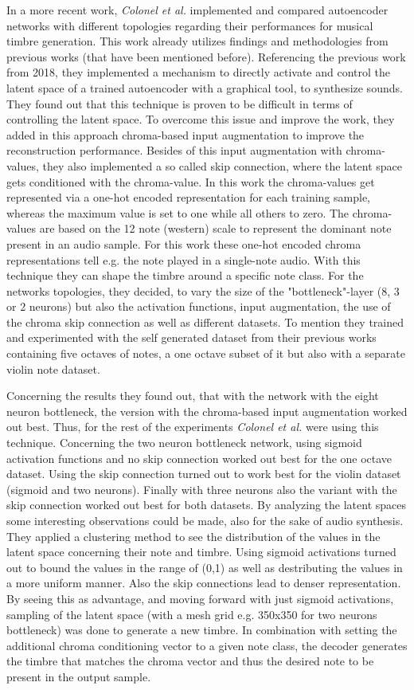 In a more recent work, \textit{Colonel et al.} implemented and compared autoencoder networks with different topologies regarding their performances for musical timbre generation. \cite{Colonel2020} This work already utilizes findings and methodologies from previous works (that have been mentioned before). Referencing the previous work from 2018, they implemented a mechanism to directly activate and control the latent space of a trained autoencoder with a graphical tool, to synthesize sounds. They found out that this technique is proven to be difficult in terms of controlling the latent space. To overcome this issue and improve the work, they added in this approach chroma-based input augmentation to improve the reconstruction performance. Besides of this input augmentation with chroma-values, they also implemented a so called skip connection, where the latent space gets conditioned with the chroma-value. In this work the chroma-values get represented via a one-hot encoded representation for each training sample, whereas the maximum value is set to one while all others to zero. The chroma-values are based on the 12 note (western) scale to represent the dominant note present in an audio sample. For this work these one-hot encoded chroma representations tell e.g. the note played in a single-note audio. With this technique they can shape the timbre around a specific note class. For the networks topologies, they decided, to vary the size of the "bottleneck"-layer (8, 3 or 2 neurons) but also the activation functions, input augmentation, the use of the chroma skip connection as well as different datasets. To mention they trained and experimented with the self generated dataset from their previous works containing five octaves of notes, a one octave subset of it but also with a separate violin note dataset.

Concerning the results they found out, that with the network with the eight neuron bottleneck, the version with the chroma-based input augmentation worked out best. Thus, for the rest of the experiments \textit{Colonel et al.} were using this technique. Concerning the two neuron bottleneck network, using sigmoid activation functions and no skip connection worked out best for the one octave dataset. Using the skip connection turned out to work best for the violin dataset (sigmoid and two neurons). Finally with three neurons also the variant with the skip connection worked out best for both datasets. By analyzing the latent spaces some interesting observations could be made, also for the sake of audio synthesis. They applied a clustering method to see the distribution of the values in the latent space concerning their note and timbre. Using sigmoid activations turned out to bound the values in the range of (0,1) as well as destributing the values in a more uniform manner. Also the skip connections lead to denser representation. By seeing this as advantage, and moving forward with just sigmoid activations, sampling of the latent space (with a mesh grid e.g. 350x350 for two neurons bottleneck) was done to generate a new timbre. In combination with setting the additional chroma conditioning vector to a given note class, the decoder generates the timbre that matches the chroma vector and thus the desired note to be present in the output sample.

